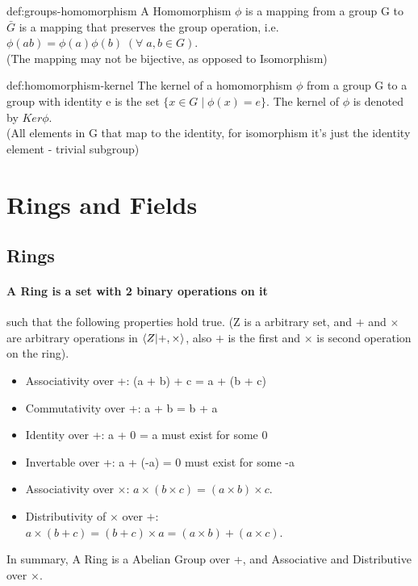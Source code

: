 \begin{definition}{def:groups-homomorphism}
    A Homomorphism $\phi$ is a mapping from a group G to $\bar{G}$ is a mapping that preserves the group operation, i.e. $ \phi(ab) = \phi(a)\phi(b) \; (\forall\;a,b \in G)$. \\
    (The mapping may not be bijective, as opposed to Isomorphism)
\end{definition}

\begin{definition}{def:homomorphism-kernel}
    The kernel of a homomorphism $\phi$ from a group G to a group with identity e is the set $\{x \in G\;|\;\phi(x) = e\}$. The kernel of $\phi$ is denoted by $Ker \phi$. \\
    (All elements in G that map to the identity, for isomorphism it's just the identity element - trivial subgroup)
\end{definition}


\section{Rings and Fields}

\subsection{Rings}

\paragraph{A Ring is a set with 2 binary operations on it}
such that the following properties hold true. (Z is a arbitrary set, and
$+$ and $\times$ are arbitrary operations in $\braket{ Z | +, \times }$,
also $+$ is the first and $\times$ is second operation on the ring).
\begin{itemize}
    \item Associativity over +: (a + b) + c = a + (b + c)
    \item Commutativity over +: a + b = b + a
    \item Identity over +: a + 0 = a must exist for some 0
    \item Invertable over +: a + (-a) = 0 must exist for some -a
    \item Associativity over $\times$: $a \times (b \times c) = (a \times b) \times c$.
    \item Distributivity of $\times$ over $+$: $a \times (b + c) = (b + c) \times a = (a \times b) + (a \times c)$.
\end{itemize}
In summary, A Ring is a Abelian Group over +, and Associative and Distributive over $\times$.

